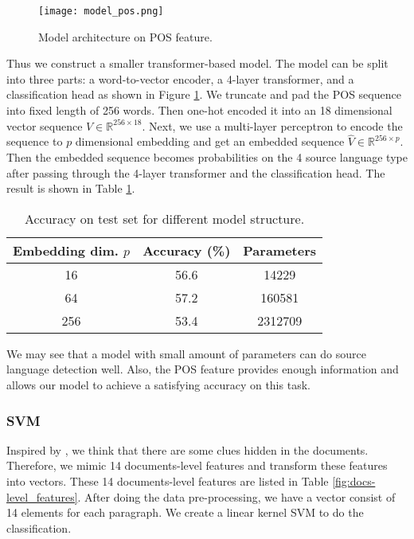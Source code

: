 \documentclass[twocolumn]{article}
\begin{document}
\begin{figure}
    \centering
    \texttt{[image: model\_pos.png]}
    \caption{Model architecture on POS feature.}
    \label{fig:model_pos}
\end{figure}

Thus we construct a smaller transformer-based model. The model can be split into three parts: a word-to-vector encoder, a 4-layer transformer, and a classification head as shown in Figure \ref{fig:model_pos}. We truncate and pad the POS sequence into fixed length of 256 words. Then one-hot encoded it into an 18 dimensional vector sequence $V \in \mathbb{R}^{256 \times 18}$. Next, we use a multi-layer perceptron to encode the sequence to $p$ dimensional embedding and get an embedded sequence $\hat{V} \in \mathbb{R}^{256 \times p}$. Then the embedded sequence becomes probabilities on the 4 source language type after passing through the 4-layer transformer and the classification head. The result is shown in Table \ref{fig:accuracy_pos}.

\begin{table}
    \begin{center}
        \begin{tabular}{c | c c}
            Embedding dim. $p$ & Accuracy (\%) & Parameters \\
            \hline
            16 & 56.6 & 14229 \\
            64 & 57.2 & 160581 \\
            256 & 53.4 & 2312709 \\
        \end{tabular}
        \caption{Accuracy on test set for different model structure.}
        \label{fig:accuracy_pos}
    \end{center}
\end{table}

We may see that a model with small amount of parameters can do source language detection well. Also, the POS feature provides enough information and allows our model to achieve a satisfying accuracy on this task.

\subsubsection*{SVM}
Inspired by \cite{literary}, we think that there are some clues hidden in the documents. Therefore, we mimic 14 documents-level features and transform these features into vectors. These 14 documents-level features are listed in Table \ref{fig:docs-level_features}. After doing the data pre-processing, we have a vector consist of 14 elements for each paragraph. We create a linear kernel SVM to do the classification.
\end{document}
